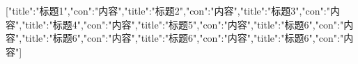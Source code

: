 [{"title":"标题1","con":"内容"},{"title":"标题2","con":"内容"},{"title":"标题3","con":"内容"},{"title":"标题4","con":"内容"},{"title":"标题5","con":"内容"},{"title":"标题6","con":"内容"},{"title":"标题6","con":"内容"},{"title":"标题6","con":"内容"},{"title":"标题6","con":"内容"}]
